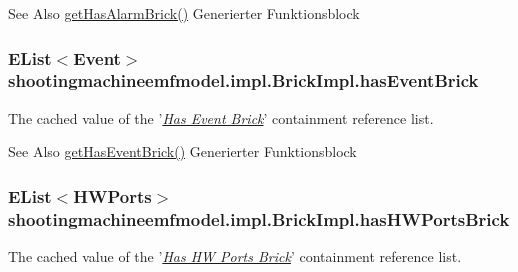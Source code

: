 \begin{DoxySeeAlso}{See Also}
\hyperlink{classshootingmachineemfmodel_1_1impl_1_1_brick_impl_a850d537faaa42e077de53bed8e629a19}{get\-Has\-Alarm\-Brick()} Generierter Funktionsblock  
\end{DoxySeeAlso}
\hypertarget{classshootingmachineemfmodel_1_1impl_1_1_brick_impl_a82cd434d746a251a4cabe6d97f7b90d2}{
\subsubsection[{has\-Event\-Brick}]{\setlength{\rightskip}{0pt plus 5cm}E\-List$<${\bf Event}$>$ shootingmachineemfmodel.\-impl.\-Brick\-Impl.\-has\-Event\-Brick\hspace{0.3cm}{\ttfamily [protected]}}}\label{classshootingmachineemfmodel_1_1impl_1_1_brick_impl_a82cd434d746a251a4cabe6d97f7b90d2}
The cached value of the '\hyperlink{classshootingmachineemfmodel_1_1impl_1_1_brick_impl_a57a8d0eb0228c2f91f38d58ea6e092ac}{{\itshape Has Event Brick}}' containment reference list.

\begin{DoxySeeAlso}{See Also}
\hyperlink{classshootingmachineemfmodel_1_1impl_1_1_brick_impl_a57a8d0eb0228c2f91f38d58ea6e092ac}{get\-Has\-Event\-Brick()} Generierter Funktionsblock  
\end{DoxySeeAlso}
\hypertarget{classshootingmachineemfmodel_1_1impl_1_1_brick_impl_abec72f296d414bf500aa27132358c6ef}{
\subsubsection[{has\-H\-W\-Ports\-Brick}]{\setlength{\rightskip}{0pt plus 5cm}E\-List$<${\bf H\-W\-Ports}$>$ shootingmachineemfmodel.\-impl.\-Brick\-Impl.\-has\-H\-W\-Ports\-Brick\hspace{0.3cm}{\ttfamily [protected]}}}\label{classshootingmachineemfmodel_1_1impl_1_1_brick_impl_abec72f296d414bf500aa27132358c6ef}
The cached value of the '\hyperlink{classshootingmachineemfmodel_1_1impl_1_1_brick_impl_aab300b09314059764d15304583bebebb}{{\itshape Has H\-W Ports Brick}}' containment reference list.

